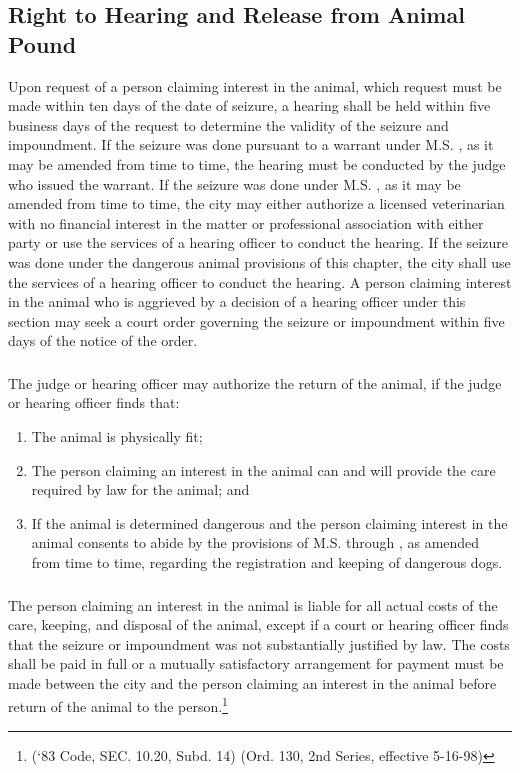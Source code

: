 \subsection{Right to Hearing and Release from Animal Pound}
Upon request of a person claiming interest in the animal, which request must be made within ten days of the date of seizure, a hearing shall be held within five business days of the request to determine the validity of the seizure and impoundment.  If the seizure was done pursuant to a warrant under M.S. , as it may be amended from time to time, the hearing must be conducted by the judge who issued the warrant.  If the seizure was done under M.S. , as it may be amended from time to time, the city may either authorize a licensed veterinarian with no financial interest in the matter or professional association with either party or use the services of a hearing officer to conduct the hearing.  If the seizure was done under the dangerous animal provisions of this chapter, the city shall use the services of a hearing officer to conduct the hearing.  A person claiming interest in the animal who is aggrieved by a decision of a hearing officer under this section may seek a court order governing the seizure or impoundment within five days of the notice of the order.
\subsubsection{}
The judge or hearing officer may authorize the return of the animal, if the judge or hearing officer finds that:
\begin{enumerate}[{\indent}a)]
    \item The animal is physically fit;
    \item The person claiming an interest in the animal can and will provide the care required by law for the animal; and
    \item If the animal is determined dangerous and the person claiming interest in the animal consents to abide by the provisions of M.S.  through , as amended from time to time, regarding the registration and keeping of dangerous dogs.
\end{enumerate}
\subsubsection{}
The person claiming an interest in the animal is liable for all actual costs of the care, keeping, and disposal of the animal, except if a court or hearing officer finds that the seizure or impoundment was not substantially justified by law.  The costs shall be paid in full or a mutually satisfactory arrangement for payment must be made between the city and the person claiming an interest in the animal before return of the animal to the person.\footnote{(‘83 Code, SEC. 10.20, Subd. 14)  (Ord. 130, 2nd Series, effective 5-16-98)}
